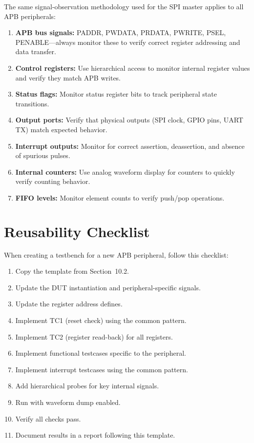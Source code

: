 The same signal-observation methodology used for the SPI master applies to all APB peripherals:

\begin{enumerate}[leftmargin=2em]
  \item \textbf{APB bus signals:} PADDR, PWDATA, PRDATA, PWRITE, PSEL, PENABLE---always monitor
        these to verify correct register addressing and data transfer.
  \item \textbf{Control registers:} Use hierarchical access to monitor internal register values
        and verify they match APB writes.
  \item \textbf{Status flags:} Monitor status register bits to track peripheral state transitions.
  \item \textbf{Output ports:} Verify that physical outputs (SPI clock, GPIO pins, UART TX)
        match expected behavior.
  \item \textbf{Interrupt outputs:} Monitor for correct assertion, deassertion, and absence of
        spurious pulses.
  \item \textbf{Internal counters:} Use analog waveform display for counters to quickly verify
        counting behavior.
  \item \textbf{FIFO levels:} Monitor element counts to verify push/pop operations.
\end{enumerate}

\section{Reusability Checklist}

When creating a testbench for a new APB peripheral, follow this checklist:

\begin{enumerate}[leftmargin=2em]
  \item[$\square$] Copy the template from Section~10.2.
  \item[$\square$] Update the DUT instantiation and peripheral-specific signals.
  \item[$\square$] Update the register address defines.
  \item[$\square$] Implement TC1 (reset check) using the common pattern.
  \item[$\square$] Implement TC2 (register read-back) for all registers.
  \item[$\square$] Implement functional testcases specific to the peripheral.
  \item[$\square$] Implement interrupt testcases using the common pattern.
  \item[$\square$] Add hierarchical probes for key internal signals.
  \item[$\square$] Run with waveform dump enabled.
  \item[$\square$] Verify all checks pass.
  \item[$\square$] Document results in a report following this template.
\end{enumerate}
